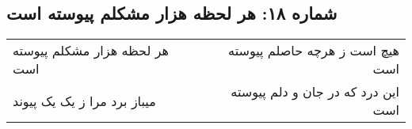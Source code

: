 \begin{center}
\section*{شماره ۱۸: هر لحظه هزار مشکلم پیوسته است}
\label{sec:018}
\begin{longtable}{l p{0.5cm} r}
هر لحظه هزار مشکلم پیوسته است
&&
هیچ است ز هرچه حاصلم پیوسته است
\\
میباز برد مرا ز یک یک پیوند
&&
این درد که در جان و دلم پیوسته است
\\
\end{longtable}
\end{center}
